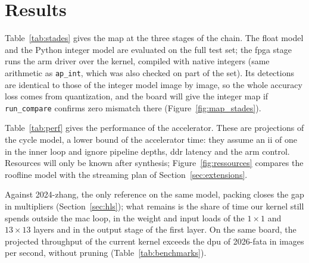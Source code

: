 \documentclass[11pt,a4paper]{article}
\begin{document}
\begin{table}[htbp]
\caption{Winograd against packing, milliseconds, Tiny-YOLOv2 and Tiny-YOLOv3
().}
\label{tab:winograd}
\footnotesize{}
\end{table}


\section{Results}\label{sec:results}

Table~\ref{tab:stades} gives the \gls{map} at the three stages of the chain. The float model and
the Python integer model are evaluated on the full test set; the \gls{fpga} stage runs the \gls{arm}
driver over the  kernel, compiled with native integers (same arithmetic as
\texttt{ap\_int}, which was also checked on part of the set). Its detections are identical
to those of the integer model image by image, so the whole accuracy loss comes from
quantization, and the board will give the integer \gls{map} if \texttt{run\_compare} confirms
zero mismatch there (Figure~\ref{fig:map_stades}).

\begin{table}[htbp]
\caption{\gls{map} at the stages of the chain, \gls{voc}2007 test ().}
\label{tab:stades}
\small{}
\end{table}


Table~\ref{tab:perf} gives the performance of the accelerator. These are projections of
the cycle model, a lower bound of the accelerator time: they assume an \gls{ii}
of one in the inner loop and ignore pipeline depths, \gls{ddr} latency and the \gls{arm} control.
Resources will only be known after synthesis; Figure~\ref{fig:ressources} compares the
\gls{roofline} model with the streaming plan of Section~\ref{sec:extensions}.

\begin{table}[htbp]
\caption{Projected performance on the KV260 at 200~MHz ().}
\label{tab:perf}
\footnotesize{}
\end{table}


Against 2024-zhang, the only reference on the same model, packing closes the gap in
multipliers (Section~\ref{sec:hls}); what remains is the share of time our kernel still
spends outside the \gls{mac} loop, in the weight and input loads of the $1\times1$ and
$13\times13$ layers and in the output stage of the first layer. On the same board, the
projected throughput of the current kernel exceeds the \gls{dpu} of 2026-fata in images per second, without pruning
(Table~\ref{tab:benchmarks}).
\end{document}
